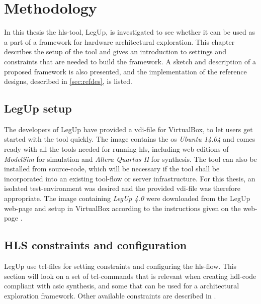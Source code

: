 \chapter{Methodology}
\label{chp:methodology} 
In this thesis the \gls{hls}-tool, LegUp, is investigated to see whether it can be used as a part of a framework for hardware architectural exploration. This chapter describes the setup of the tool and gives an introduction to settings and constraints that are needed to build the framework. A sketch and description of a proposed framework is also presented, and the implementation of the reference designs, described in \cref{sec:refdes}, is listed.
\section{LegUp setup}
The developers of LegUp have provided a \gls{vdi}-file for VirtualBox, to let users get started with the tool quickly. The image contains the \gls{os} \textit{Ubuntu 14.04} and comes ready with all the tools needed for running \gls{hls}, including web editions of \textit{ModelSim} for simulation and \textit{Altera Quartus II} for synthesis. The tool can also be installed from source-code, which will be necessary if the tool shall be incorporated into an existing tool-flow or server infrastructure.
For this thesis, an isolated test-environment was desired and the provided \gls{vdi}-file was therefore appropriate. The image containing \textit{LegUp 4.0} were downloaded from the LegUp web-page and setup in VirtualBox according to the instructions given on the web-page \cite{legupgetstarted}. 

\section{HLS constraints and configuration}
LegUp use \gls{tcl}-files for setting constraints and configuring the \gls{hls}-flow. This section will look on a set of \gls{tcl}-commands that is relevant when creating \gls{hdl}-code compliant with \gls{asic} synthesis, and some that can be used for a architectural exploration framework. Other available constraints are described in \cite{legupconst}.
